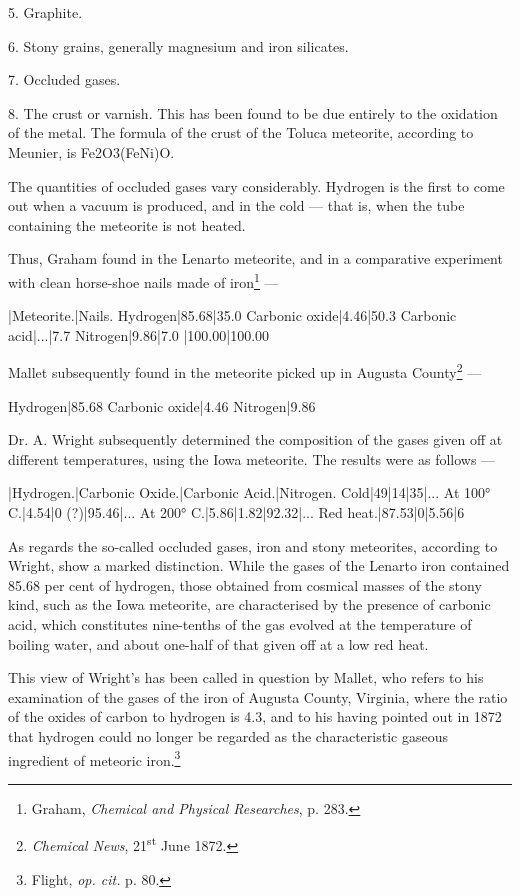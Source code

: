 \documentclass[a4paper, 12pt, oneside, polutonikogreek, english]{article}
\begin{document}
5. Graphite.

6. Stony grains, generally magnesium and iron silicates.

7. Occluded gases.

8. The crust or varnish. This has been found to be due entirely to the oxidation of the metal. The formula of the crust of the Toluca meteorite, according to Meunier, is Fe2O3(FeNi)O.

The quantities of occluded gases vary considerably. Hydrogen is the first to come out when a vacuum is produced, and in the cold --- that is, when the tube containing the meteorite is not heated.

Thus, Graham found in the Lenarto meteorite, and in a comparative experiment with clean horse-shoe nails made of iron\footnote{Graham, \emph{Chemical and Physical Researches}, p. 283.} ---

|Meteorite.|Nails. 
Hydrogen|85.68|35.0 
Carbonic oxide|4.46|50.3 
Carbonic acid|...|7.7 
Nitrogen|9.86|7.0 
|100.00|100.00

Mallet subsequently found in the meteorite picked up in Augusta County\footnote{\emph{Chemical News}, 21\textsuperscript{st} June 1872.} ---

Hydrogen|85.68 
Carbonic oxide|4.46 
Nitrogen|9.86

Dr. A. Wright subsequently determined the composition of the gases given off at different temperatures, using the Iowa meteorite. The results were as follows ---

|Hydrogen.|Carbonic Oxide.|Carbonic Acid.|Nitrogen. 
Cold|49|14|35|... 
At 100° C.|4.54|0 (?)|95.46|... 
At 200° C.|5.86|1.82|92.32|... 
Red heat.|87.53|0|5.56|6

As regards the so-called occluded gases, iron and stony meteorites, according to Wright, show a marked distinction. While the gases of the Lenarto iron contained 85.68 per cent of hydrogen, those obtained from cosmical masses of the stony kind, such as the Iowa meteorite, are characterised by the presence of carbonic acid, which constitutes nine-tenths of the gas evolved at the temperature of boiling water, and about one-half of that given off at a low red heat.

This view of Wright's has been called in question by Mallet, who refers to his examination of the gases of the iron of Augusta County, Virginia, where the ratio of the oxides of carbon to hydrogen is 4.3, and to his having pointed out in 1872 that hydrogen could no longer be regarded as the characteristic gaseous ingredient of meteoric iron.\footnote{Flight, \emph{op. cit.} p. 80.}
\end{document}
